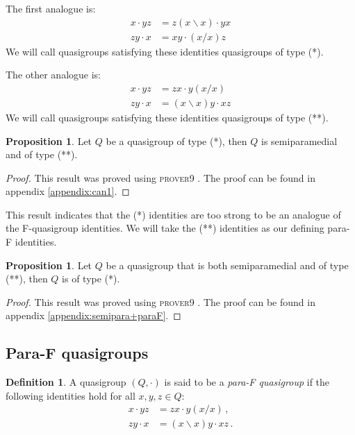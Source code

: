 \documentclass[12pt]{report}
\theoremstyle{definition}
\newtheorem{prp}[thm]{Proposition}
\newtheorem{dfn}[thm]{Definition}
\newcommand{\ldv}{\backslash}       %
\newcommand{\rdv}{/}                %
\begin{document}
The first analogue is:
\begin{align*}
  x\cdot yz &= z(x\ldv x)\cdot yx\\
  zy\cdot x &= xy\cdot (x\rdv x)z
\end{align*}
We will call quasigroups satisfying these identities quasigroups of type (*).

The other analogue is:
\begin{align*}
  x\cdot yz &= zx\cdot y(x\rdv x)\\
  zy\cdot x &= (x\ldv x)y\cdot xz
\end{align*}
We will call quasigroups satisfying these identities quasigroups of type (**).

\begin{prp}\label{can1}
  Let $Q$ be a quasigroup of type (*), then $Q$ is semiparamedial and of type (**). 
\end{prp}

\begin{proof}
  This result was proved using \textsc{prover9} \cite{Prover9}. The proof can be found in appendix \ref{appendix:can1}.
\end{proof}

This result indicates that the (*) identities are too strong to be an analogue of the F-quasigroup
  identities. We will take the (**) identities as our defining para-F identities.

\begin{prp}\label{semipara+paraF}
  Let $Q$ be a quasigroup that is both semiparamedial and of type (**), then $Q$ is of type (*).
\end{prp}

\begin{proof}
  This result was proved using \textsc{prover9} \cite{Prover9}. The proof can be found in
    appendix \ref{appendix:semipara+paraF}.
\end{proof}

\subsection{Para-F quasigroups}

\begin{dfn}
  A quasigroup $(Q,\cdot)$ is said to be a \emph{para-F quasigroup} if the following identities
    hold for all $x,y,z\in Q$:
  \begin{align}
    x\cdot yz &= zx\cdot y(x\rdv x)\,,  \label{eq:pF1}  \tag{P1} \\
    zy\cdot x &= (x\ldv x)y\cdot xz\,.  \label{eq:pF2}  \tag{P2}
  \end{align}
\end{dfn}
\end{document}
